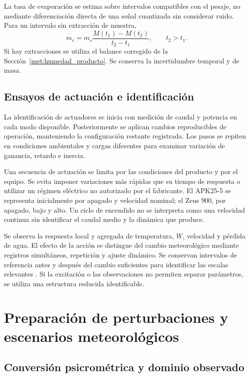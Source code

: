 La tasa de evaporación se estima sobre intervalos compatibles con el pesaje, no mediante diferenciación directa de una señal cuantizada sin considerar ruido. Para un intervalo sin extracción de muestra,
\begin{equation}
\overline{\dot m}_e=
m_s\frac{M(t_1)-M(t_2)}{t_2-t_1},
\qquad t_2>t_1.
\label{met:evaporacion_intervalo}
\end{equation}
Si hay extracciones se utiliza el balance corregido de la Sección~\ref{met:humedad_producto}. Se conserva la incertidumbre temporal y de masa.

\subsection{Ensayos de actuación e identificación}

La identificación de actuadores se inicia con medición de caudal y potencia en cada modo disponible. Posteriormente se aplican cambios reproducibles de operación, manteniendo la configuración restante registrada. Los pasos se repiten en condiciones ambientales y cargas diferentes para examinar variación de ganancia, retardo e inercia.

Una secuencia de actuación se limita por las condiciones del producto y por el equipo. Se evita imponer variaciones más rápidas que su tiempo de respuesta o utilizar un régimen eléctrico no autorizado por el fabricante. El APK25-5 se representa inicialmente por apagado y velocidad nominal; el Zeus 900, por apagado, bajo y alto. Un ciclo de encendido no se interpreta como una velocidad continua sin identificar el caudal medio y la dinámica que produce.

Se observa la respuesta local y agregada de temperatura, $W$, velocidad y pérdida de agua. El efecto de la acción se distingue del cambio meteorológico mediante registros simultáneos, repetición y ajuste dinámico. Se conservan intervalos de referencia antes y después del cambio suficientes para identificar las escalas relevantes \cite{ljung1999}. Si la excitación o las observaciones no permiten separar parámetros, se utiliza una estructura reducida identificable.

\section{Preparación de perturbaciones y escenarios meteorológicos}
\label{met:meteorologia}

\subsection{Conversión psicrométrica y dominio observado}

